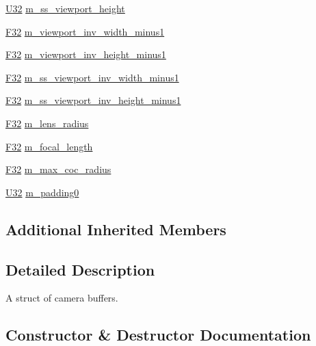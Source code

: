 \begin{DoxyCompactItemize}
\hyperlink{namespacemage_a41c104c036fba3756a74e19f793eeaa1}{U32} \hyperlink{structmage_1_1_camera_buffer_a6bbc5a57e9f456518afacf0a0e5633ed}{m\+\_\+ss\+\_\+viewport\+\_\+height}
\item 
\hyperlink{namespacemage_aa97e833b45f06d60a0a9c4fc22ae02c0}{F32} \hyperlink{structmage_1_1_camera_buffer_a3d56a38eb30fb0f0778d23f61f9988fa}{m\+\_\+viewport\+\_\+inv\+\_\+width\+\_\+minus1}
\item 
\hyperlink{namespacemage_aa97e833b45f06d60a0a9c4fc22ae02c0}{F32} \hyperlink{structmage_1_1_camera_buffer_a05564cd690597c4700ca292c942c0737}{m\+\_\+viewport\+\_\+inv\+\_\+height\+\_\+minus1}
\item 
\hyperlink{namespacemage_aa97e833b45f06d60a0a9c4fc22ae02c0}{F32} \hyperlink{structmage_1_1_camera_buffer_ad881a3acbf1eed761374a50296e35e47}{m\+\_\+ss\+\_\+viewport\+\_\+inv\+\_\+width\+\_\+minus1}
\item 
\hyperlink{namespacemage_aa97e833b45f06d60a0a9c4fc22ae02c0}{F32} \hyperlink{structmage_1_1_camera_buffer_a62f3a9c95c3e3cecfc1744de82ac2ca2}{m\+\_\+ss\+\_\+viewport\+\_\+inv\+\_\+height\+\_\+minus1}
\item 
\hyperlink{namespacemage_aa97e833b45f06d60a0a9c4fc22ae02c0}{F32} \hyperlink{structmage_1_1_camera_buffer_ac3b147c3f8971a8b06bfcb3bd971179c}{m\+\_\+lens\+\_\+radius}
\item 
\hyperlink{namespacemage_aa97e833b45f06d60a0a9c4fc22ae02c0}{F32} \hyperlink{structmage_1_1_camera_buffer_a5ecb7ec90a7bc1900846d53488315d33}{m\+\_\+focal\+\_\+length}
\item 
\hyperlink{namespacemage_aa97e833b45f06d60a0a9c4fc22ae02c0}{F32} \hyperlink{structmage_1_1_camera_buffer_a324324132e7cd8d0d0259a47d0305430}{m\+\_\+max\+\_\+coc\+\_\+radius}
\item 
\hyperlink{namespacemage_a41c104c036fba3756a74e19f793eeaa1}{U32} \hyperlink{structmage_1_1_camera_buffer_a56019b41362cd7ddb5d747ed4705d854}{m\+\_\+padding0}
\end{DoxyCompactItemize}
\subsection*{Additional Inherited Members}


\subsection{Detailed Description}
A struct of camera buffers. 

\subsection{Constructor \& Destructor Documentation}
\hypertarget{structmage_1_1_camera_buffer_aca0a689a43c84fdc02e72d792b1a0ab3}{}\label{structmage_1_1_camera_buffer_aca0a689a43c84fdc02e72d792b1a0ab3} 
